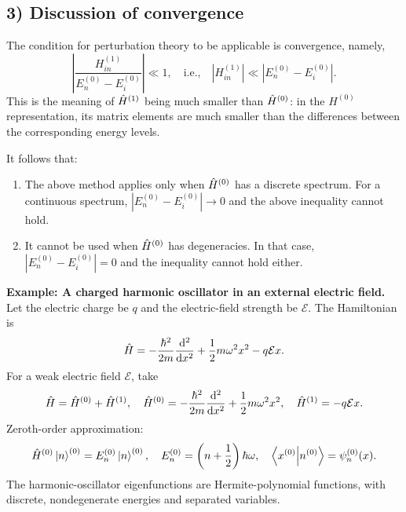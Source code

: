 \subsection*{3) Discussion of convergence}
The condition for perturbation theory to be applicable is convergence, namely,
\begin{equation}
 \left|\frac{H_{in}^{(1)}}{E_n^{(0)}-E_i^{(0)}}\right|\ll1,
 \quad\text{i.e.,}\quad
 |H_{in}^{(1)}|\ll|E_n^{(0)}-E_i^{(0)}|.
\end{equation}
This is the meaning of $\hat{H}^{(1)}$ being much smaller than $\hat{H}^{(0)}$: in the $H^{(0)}$ representation, its matrix elements are much smaller than the differences between the corresponding energy levels.

It follows that:
\begin{enumerate}
\item The above method applies only when $\hat{H}^{(0)}$ has a discrete spectrum. For a continuous spectrum, $|E_n^{(0)}-E_i^{(0)}|\to0$ and the above inequality cannot hold.
\item It cannot be used when $\hat{H}^{(0)}$ has degeneracies. In that case, $|E_n^{(0)}-E_i^{(0)}|=0$ and the inequality cannot hold either.
\end{enumerate}
\textbf{Example: A charged harmonic oscillator in an external electric field.}
Let the electric charge be $q$ and the electric-field strength be $\mathcal E$. The Hamiltonian is
\begin{equation}
 \hat{H}=-\frac{\hbar^2}{2m}\frac{\mathrm{d}^2}{\mathrm{d} x^2}
 +\frac12m\omega^2x^2-q\mathcal E x.
\end{equation}
For a weak electric field $\mathcal E$, take
\begin{equation}
 \hat{H}=\hat{H}^{(0)}+\hat{H}^{(1)},\quad
 \hat{H}^{(0)}=-\frac{\hbar^2}{2m}\frac{\mathrm{d}^2}{\mathrm{d} x^2}+\frac12m\omega^2x^2,
 \quad\hat{H}^{(1)}=-q\mathcal E x.
\end{equation}
Zeroth-order approximation:
\begin{equation}
 \hat{H}^{(0)}\left|n\right\rangle^{(0)}=E_n^{(0)}\left|n\right\rangle^{(0)},\quad
 E_n^{(0)}=\left(n+\frac12\right)\hbar\omega,
 \quad\left\langle x^{(0)}\middle|n^{(0)}\right\rangle=\psi_n^{(0)}(x).
\end{equation}
The harmonic-oscillator eigenfunctions are Hermite-polynomial functions, with discrete, nondegenerate energies and separated variables.

